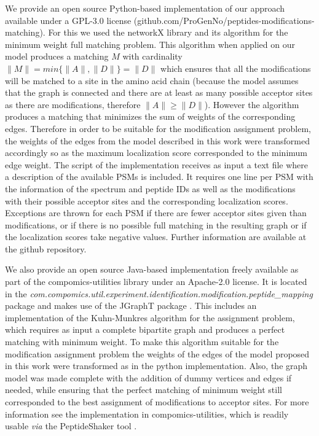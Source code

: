 \documentclass[]{article}
\begin{document}
We provide an open source Python-based implementation of our approach available under a GPL-3.0 license (github.com/ProGenNo/peptides-modifications-matching). For this we used the networkX \cite{networkX} library and its algorithm for the minimum weight full matching problem. This algorithm when applied on our model produces a matching $M$ with cardinality $\|M\| = min\{\|A\|, \|D\|\} = \|D\|$ which ensures that all the modifications will be matched to a site in the amino acid chain (because the model assumes that the graph is connected and there are at least as many possible acceptor sites as there are modifications, therefore $\|A\| \geq \|D\|$). However the algorithm produces a matching that minimizes the sum of weights of the corresponding edges. Therefore in order to be suitable for the modification assignment problem, the weights of the edges from the model described in this work were transformed accordingly so as the maximum localization score corresponded to the minimum edge weight. The script of the implementation receives as input a text file where a description of the available PSMs is included. It requires one line per PSM with the information of the spectrum and peptide IDs as well as the modifications with their possible acceptor sites and the corresponding localization scores. Exceptions are thrown for each PSM if there are fewer acceptor sites given than modifications, or if there is no possible full matching in the resulting graph or if the localization scores take negative values. Further information are available at the github repository. 

We also provide an open source Java-based implementation freely available as part of the compomics-utilities library \cite{compomics} under an Apache-2.0 license. It is located in the \textit{com.compomics.util.experiment.identification.modification.peptide\_mapping} package and makes use of the JGraphT package \cite{JGraphT}. This includes an implementation of the Kuhn-Munkres algorithm for the assignment problem, which requires as input a complete bipartite graph and produces a perfect matching with minimum weight. To make this algorithm suitable for the modification assignment problem the weights of the edges of the model proposed in this work were transformed as in the python implementation. Also, the graph model was made complete with the addition of dummy vertices and edges if needed, while ensuring that the perfect matching of minimum weight still corresponded to the best assignment of modifications to acceptor sites. For more information see the implementation in compomics-utilities, which is readily usable \textit{via} the PeptideShaker tool \cite{PeptideShaker}.
\end{document}
